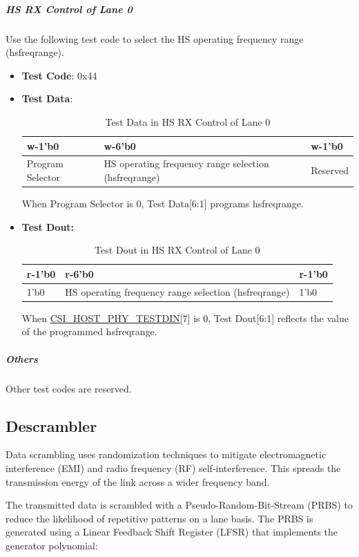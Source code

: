 \documentclass[main\_\_EN.tex]{subfiles}
\begin{document}
\subparagraph{HS RX Control of Lane 0}
\label{sec:mipicsi-test-code-0x44}

Use the following test code to select the HS operating frequency range (hsfreqrange).

\begin{itemize}
    \item \textbf{Test Code}: 0x44
    \item \textbf{Test Data}:
        \begin{longtable}{ | p{4cm} | p{8cm} | p{2cm} |}
        \caption{Test Data in HS RX Control of Lane 0}
        \label{tab:mipicsi-hsfreqrange} \\
        \hline
        \rowcolor{lightgray}
        \textbf{w-1'b0} & \textbf{w-6'b0} & \textbf{w-1'b0} \\ \hline
        Program Selector & HS operating frequency range selection (hsfreqrange) & Reserved  \\ \hline
        \end{longtable}
        When Program Selector is 0, Test Data[6:1] programs hsfreqrange.
    \item \textbf{Test Dout: }
        \begin{longtable}{ | p{4cm} | p{8cm} | p{2cm} |}
        \caption{Test Dout in HS RX Control of Lane 0}
        \label{tab:mipicsi-hsfreqrange-dout} \\
        \hline
        \rowcolor{lightgray}
        \textbf{r-1'b0} & \textbf{r-6'b0} & \textbf{r-1'b0} \\ \hline
        1'b0 & HS operating frequency range selection (hsfreqrange) & 1'b0  \\ \hline
        \end{longtable}
        When \hyperref[fielddesc:CSIHOSTPHYTESTDIN]{CSI\_HOST\_PHY\_TESTDIN}[7] is 0, Test Dout[6:1] reflects the value of the programmed hsfreqrange.
\end{itemize}

\subparagraph{Others}
Other test codes are reserved.

\subsection{Descrambler}

Data scrambling uses randomization techniques to mitigate electromagnetic interference (EMI) and radio frequency (RF) self-interference. This spreads the transmission energy of the link across a wider frequency band.

The transmitted data is scrambled with a Pseudo-Random-Bit-Stream (PRBS) to reduce the likelihood of repetitive patterns on a lane basis. The PRBS is generated using a Linear Feedback Shift Register (LFSR) that implements the generator polynomial:
\end{document}
